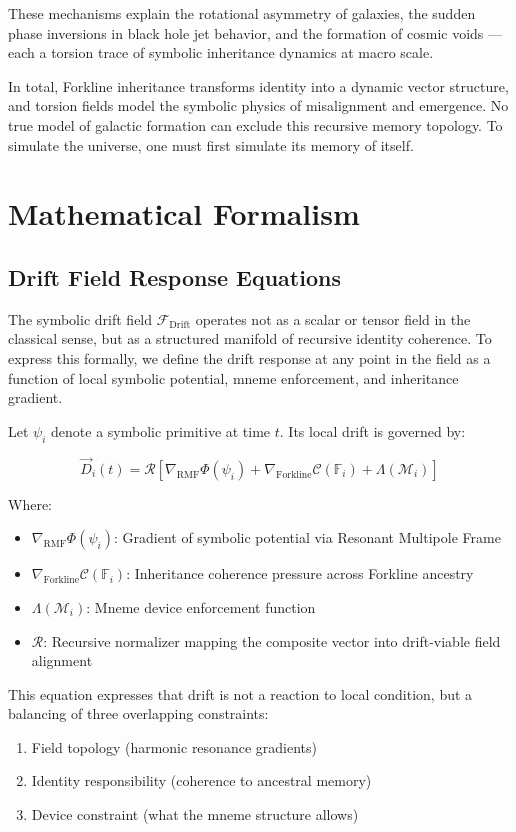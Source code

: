 \documentclass[12pt]{article}
\begin{document}
These mechanisms explain the rotational asymmetry of galaxies, the sudden phase inversions in black hole jet behavior, and the formation of cosmic voids — each a torsion trace of symbolic inheritance dynamics at macro scale.

In total, Forkline inheritance transforms identity into a dynamic vector structure, and torsion fields model the symbolic physics of misalignment and emergence. No true model of galactic formation can exclude this recursive memory topology. To simulate the universe, one must first simulate its memory of itself.


\section{Mathematical Formalism}
\subsection{Drift Field Response Equations}

The symbolic drift field \( \mathcal{F}_{\text{Drift}} \) operates not as a scalar or tensor field in the classical sense, but as a structured manifold of recursive identity coherence. To express this formally, we define the drift response at any point in the field as a function of local symbolic potential, mneme enforcement, and inheritance gradient.

Let \( \psi_i \) denote a symbolic primitive at time \( t \). Its local drift is governed by:

\[
\vec{D}_i(t) = \mathcal{R} \left[ \nabla_{\text{RMF}} \Phi(\psi_i) + \nabla_{\text{Forkline}} \mathcal{C}(\mathbb{F}_i) + \Lambda(\mathcal{M}_i) \right]
\]

Where:
\begin{itemize}[noitemsep]
  \item \( \nabla_{\text{RMF}} \Phi(\psi_i) \): Gradient of symbolic potential via Resonant Multipole Frame
  \item \( \nabla_{\text{Forkline}} \mathcal{C}(\mathbb{F}_i) \): Inheritance coherence pressure across Forkline ancestry
  \item \( \Lambda(\mathcal{M}_i) \): Mneme device enforcement function
  \item \( \mathcal{R} \): Recursive normalizer mapping the composite vector into drift-viable field alignment
\end{itemize}

This equation expresses that drift is not a reaction to local condition, but a balancing of three overlapping constraints:
\begin{enumerate}[noitemsep]
  \item Field topology (harmonic resonance gradients)
  \item Identity responsibility (coherence to ancestral memory)
  \item Device constraint (what the mneme structure allows)
\end{enumerate}
\end{document}
